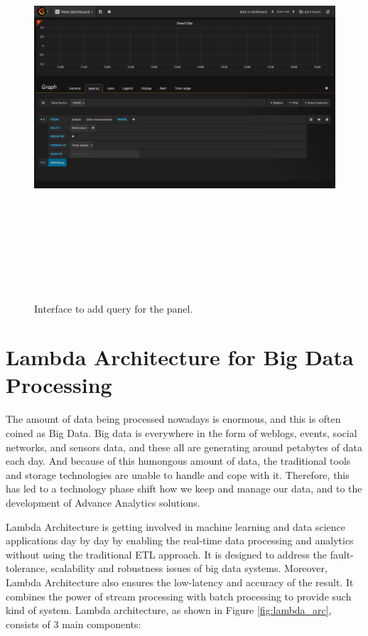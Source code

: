 \begin{figure}[htpb]
	\centering
	\includegraphics[width=16cm,height=15cm,keepaspectratio=true]{images/gr_query}
	\caption{
		Interface to add query for the panel.
	}
	\label{fig:gr_query}
\end{figure}


\section{Lambda Architecture for Big Data Processing} \label{sec:lmb_arc}
The amount of data being processed nowadays is enormous, and this is often coined as Big Data. Big data is everywhere in the form of weblogs, events, social networks, and sensors data, and these all are generating around petabytes of data each day. And because of this humongous amount of data, the traditional tools and storage technologies are unable to handle and cope with it. Therefore, this has led to a technology phase shift how we keep and manage our data, and to the development of Advance Analytics solutions.

Lambda Architecture \cite{UBDLAH} \cite{oreillyla} \cite{7364082} \cite{maprla} is getting involved in machine learning and data science applications day by day by enabling the real-time data processing and analytics without using the traditional ETL approach. It is designed to address the fault-tolerance, scalability and robustness issues of big data systems. Moreover, Lambda Architecture also ensures the low-latency and accuracy of the result. It combines the power of stream processing with batch processing to provide such kind of system.
Lambda architecture, as shown in Figure \ref{fig:lambda_arc}, consists of 3 main components:


